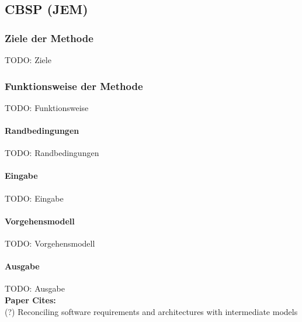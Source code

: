 \subsection{CBSP (JEM)}\label{cbsp}

\subsubsection{Ziele der Methode}

TODO: Ziele \\



\subsubsection{Funktionsweise der Methode}

TODO: Funktionsweise \\

\paragraph{Randbedingungen}

TODO: Randbedingungen \\


\paragraph{Eingabe}

TODO: Eingabe \\


\paragraph{Vorgehensmodell}

TODO: Vorgehensmodell \\



\paragraph{Ausgabe}

TODO: Ausgabe \\


\textbf{Paper Cites:} \\
(?) Reconciling software requirements and architectures with intermediate models \\